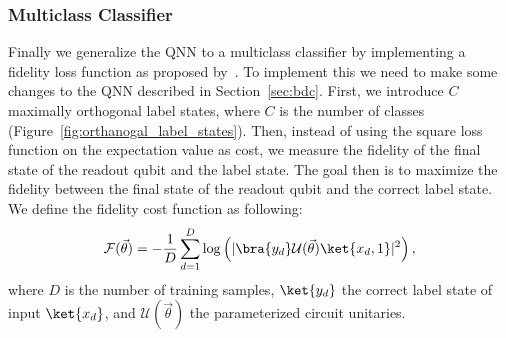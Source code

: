 \documentclass[a4paper,10pt]{article}
\begin{document}
\subsubsection{Multiclass Classifier}
Finally we generalize the QNN to a multiclass classifier by implementing a fidelity loss function as proposed by~\cite{perez2019data}.
To implement this we need to make some changes to the QNN described in Section~\ref{sec:bdc}.
First, we introduce $C$ maximally orthogonal label states, where $C$ is the number of classes (Figure~\ref{fig:orthanogal_label_states}).
Then, instead of using the square loss function on the expectation value as cost, we measure the fidelity of the final state of the readout qubit and the label state.
The goal then is to maximize the fidelity between the final state of the readout qubit and the correct label state.
We define the fidelity cost function as following:
\begin{equation}
\mathcal{F}(\vec{\theta}) = - \dfrac{1}{D} \sum_{d=1}^{D} \log \left( \lvert \bra{y_d}\mathcal{U}(\vec{\theta})\ket{x_d, 1} \rvert^2\right),
\end{equation}
where $D$ is the number of training samples, $\ket{y_d}$ the correct label state of input $\ket{x_d}$, and $\mathcal{U}(\vec{\theta})$ the parameterized circuit unitaries.
\end{document}
